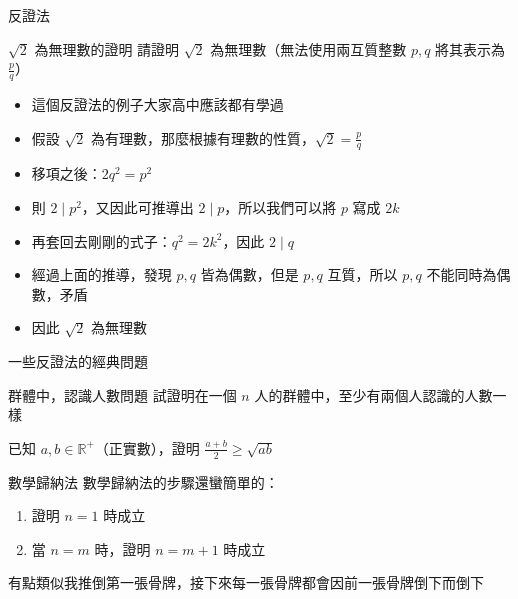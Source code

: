 \documentclass[aspectratio=169]{beamer}
\begin{document}
    \begin{frame}{反證法}
        \begin{block}{$\sqrt{2}$ 為無理數的證明}
            請證明 $\sqrt{2}$ 為無理數（無法使用兩互質整數 $p, q$ 將其表示為 $\frac{p}{q}$）
        \end{block}

        \begin{itemize}
            \item<1-> 這個反證法的例子大家高中應該都有學過
            \item<2-> 假設 $\sqrt{2}$ 為有理數，那麼根據有理數的性質，$\sqrt{2} = \frac{p}{q}$
            \item<3-> 移項之後：$2q^2 = p^2$
            \item<4-> 則 $2 \mid p^2$，又因此可推導出 $2 \mid p$，所以我們可以將 $p$ 寫成 $2k$
            \item<5-> 再套回去剛剛的式子：$q^2 = 2k^2$，因此 $2 \mid q$
            \item<6-> 經過上面的推導，發現 $p, q$ 皆為偶數，但是 $p, q$ 互質，所以 $p, q$ 不能同時為偶數，矛盾
            \item<7-> 因此 $\sqrt{2}$ 為無理數
        \end{itemize}
    \end{frame}

    \begin{frame}{一些反證法的經典問題}
        \begin{block}{群體中，認識人數問題}
            試證明在一個 $n$ 人的群體中，至少有兩個人認識的人數一樣
        \end{block}

        \begin{block}
            已知 $a, b \in \mathbb{R}^+$（正實數），證明 $\frac{a + b}{2} \ge \sqrt{ab}$
        \end{block}
    \end{frame}
    
    \begin{frame}{數學歸納法}
        數學歸納法的步驟還蠻簡單的：
        \begin{enumerate}
            \item 證明 $n = 1$ 時成立
            \item 當 $n = m$ 時，證明 $n = m + 1$ 時成立
        \end{enumerate}

        有點類似我推倒第一張骨牌，接下來每一張骨牌都會因前一張骨牌倒下而倒下
    \end{frame}
\end{document}
